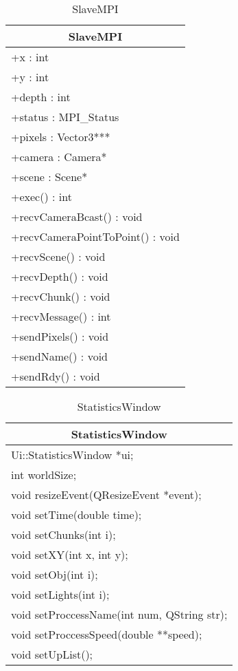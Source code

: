 \begin{longtable}{|p{16cm}|}
    \caption{SlaveMPI} \label{tab:SlaveMPI} \\ \hline
    \multicolumn{1}{|c|}{SlaveMPI} \\ \hline
    +x : int \\ 
	+y : int \\
	+depth : int \\
	+status : MPI\_Status \\
	+pixels : Vector3*** \\
	+camera : Camera* \\
	+scene : Scene* \\ \hline
	+exec() : int \\
	+recvCameraBcast() : void \\
	+recvCameraPointToPoint() : void \\
	+recvScene() : void \\
	+recvDepth() : void \\
	+recvChunk() : void \\
	+recvMessage() : int \\
	+sendPixels() : void \\
	+sendName() : void \\
	+sendRdy() : void \\
	\hline
\end{longtable}

\begin{longtable}{|p{16cm}|}
    \caption{StatisticsWindow} \label{tab:StatisticsWindow} \\ \hline
    \multicolumn{1}{|c|}{StatisticsWindow} \\ \hline
    Ui::StatisticsWindow *ui; \\
    int worldSize; \\
    \hline
	void resizeEvent(QResizeEvent *event); \\
    void setTime(double time); \\
    void setChunks(int i); \\
    void setXY(int x, int y); \\
    void setObj(int i); \\
    void setLights(int i); \\
    void setProccessName(int num, QString str); \\
    void setProccessSpeed(double **speed); \\
    void setUpList(); \\
    \hline
\end{longtable}


